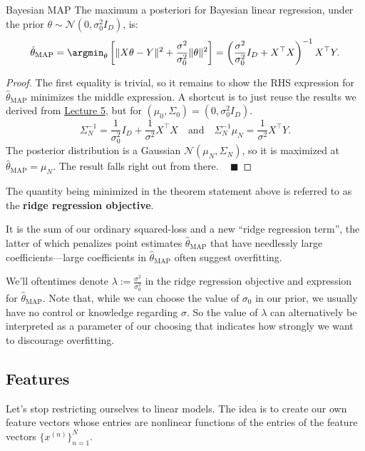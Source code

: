 \begin{theorem}{Bayesian MAP}
    The maximum a posteriori for Bayesian linear regression,
    under the prior $\theta \sim \mathcal{N}(0, \sigma_0^2 I_D)$, is:
    \[ \hat{\theta}_{\mathrm{MAP}}
    = \argmin_{\theta} \left[ \|X\theta - Y\|^2
    + \frac{\sigma^2}{\sigma_0^2}\|\theta\|^2 \right]
    = \left(\frac{\sigma^2}{\sigma_0^2}I_D + X^{\top}X\right)^{-1}
    X^{\top}Y. \]
\end{theorem}

\begin{proof}
    The first equality is trivial,
    so it remains to show the RHS expression for $\hat{\theta}_{\mathrm{MAP}}$
    minimizes the middle expression.
    A shortcut is to just reuse the results we derived from
    \href{/6.790/lectures/5/#bayesian-linear-regression-theory}{Lecture 5},
    but for $(\mu_0, \Sigma_0) = (0, \sigma_0^2 I_D)$.
    \[ \Sigma_N^{-1}
    = \frac{1}{\sigma_0^2} I_D + \frac{1}{\sigma^2} X^{\top}X
    ~~~ \text{ and } ~~~
    \Sigma_N^{-1}\mu_N
    = \frac{1}{\sigma^2}X^{\top}Y. \]
    The posterior distribution is a Gaussian $\mathcal{N}(\mu_N, \Sigma_N)$,
    so it is maximized at $\hat{\theta}_{\mathrm{MAP}} = \mu_N$.
    The result falls right out from there. ~ $\blacksquare$
\end{proof}

The quantity being minimized in the theorem statement above
is referred to as the \textbf{ridge regression objective}.

It is the sum of our ordinary squared-loss
and a new ``ridge regression term'',
the latter of which penalizes point estimates $\hat{\theta}_{\mathrm{MAP}}$
that have needlessly large coefficients---large
coefficients in $\hat{\theta}_{\mathrm{MAP}}$
often suggest overfitting.

We'll oftentimes denote $\lambda := \frac{\sigma^2}{\sigma_0^2}$
in the ridge regression objective and
expression for $\hat{\theta}_{\mathrm{MAP}}$.
Note that, while we can choose the value of $\sigma_0$ in our prior,
we usually have no control or knowledge regarding $\sigma$.
So the value of $\lambda$ can alternatively be interpreted
as a parameter of our choosing that indicates
how strongly we want to discourage overfitting.

\subsection{Features}

Let's stop restricting ourselves to linear models.
The idea is to create our own feature vectors
whose entries are nonlinear functions
of the entries of the feature vectors $\{x^{(n)}\}_{n = 1}^N$.


